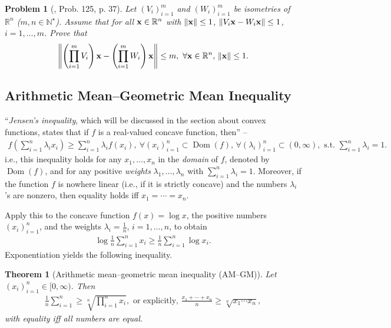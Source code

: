 \documentclass[oneside]{book}
\numberwithin{equation}{section}
\newtheorem{theorem}{Theorem}[section]
\newtheorem{problem}{Problem}[section]
\begin{document}
\begin{problem}[\cite{Gelca_Andreescu2017}, Prob. 125, p. 37]
	Let $(V_i)_{i=1}^m$ and $(W_i)_{i=1}^m$ be isometries of $\mathbb{R}^n$ ($m,n\in\mathbb{N}^\star$). Assume that for all ${\bf x}\in\mathbb{R}^n$ with $\|{\bf x}\|\le 1$, $\|V_i{\bf x} - W_i{\bf x}\|\le 1$, $i = 1,\ldots,m$. Prove that
	\begin{align*}
		\left\|\left(\prod_{i=1}^m V_i\right){\bf x} - \left(\prod_{i=1}^m W_i\right){\bf x}\right\|\le m,\ \forall{\bf x}\in\mathbb{R}^n,\,\|{\bf x}\|\le 1.
	\end{align*}
\end{problem}

\subsection{Arithmetic Mean--Geometric Mean Inequality}
``\textit{Jensen's inequality}, which will be discussed in the section about convex functions, states that if $f$ is a real-valued concave function, then'' -- \cite[Subsect. 2.1.5, p. 38]{Gelca_Andreescu2017}
\begin{align*}
	f\left(\sum_{i=1}^n \lambda_ix_i\right)\ge\sum_{i=1}^n \lambda_if(x_i),\ \forall(x_i)_{i=1}^n\subset\operatorname{Dom}(f),\,\forall(\lambda_i)_{i=1}^n\subset(0,\infty),\mbox{ s.t. }\sum_{i=1}^n \lambda_i = 1.
\end{align*}
i.e., this inequality holds for any $x_1,\ldots,x_n$ in the \textit{domain} of $f$, denoted by $\operatorname{Dom}(f)$, and for any positive \textit{weights} $\lambda_1,\ldots,\lambda_n$ with $\sum_{i=1}^n \lambda_i = 1$. Moreover, if the function $f$ is nowhere linear (i.e., if it is strictly concave) and the numbers $\lambda_i$'s are nonzero, then equality holds iff $x_1 = \cdots = x_n$.

Apply this to the concave function $f(x) = \log x$, the positive numbers $(x_i)_{i=1}^n$, and the weights $\lambda_i = \frac{1}{n}$, $i = 1,\ldots,n$, to obtain
\begin{align*}
	\log\frac{1}{n}\sum_{i=1}^n x_i\ge\frac{1}{n}\sum_{i=1}^n \log x_i.
\end{align*}
Exponentiation yields the following inequality.

\begin{theorem}[Arithmetic mean--geometric mean inequality (AM--GM)]
	Let $(x_i)_{i=1}^n\in[0,\infty)$. Then
	\begin{align*}
		\frac{1}{n}\sum_{i=1}^n\ge\sqrt[n]{\prod_{i=1}^n x_i},\mbox{ or explicitly, }\frac{x_1 + \cdots + x_n}{n}\ge\sqrt[n]{x_1\cdots x_n},
	\end{align*}
	with equality iff all numbers are equal.
\end{theorem}
\end{document}
